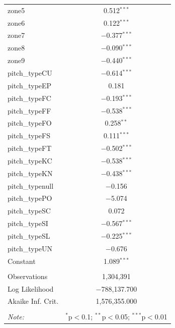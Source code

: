 \documentclass{article}
\begin{document}
\begin{table}[!htbp]
\begin{tabular}{@{\extracolsep{5pt}}lc}
 zone5 & 0.512$^{***}$ \\ 
  
 zone6 & 0.122$^{***}$ \\ 
 
 zone7 & $-$0.377$^{***}$ \\ 
  
 zone8 & $-$0.090$^{***}$ \\ 
 
 zone9 & $-$0.440$^{***}$ \\ 
 
 pitch\_typeCU & $-$0.614$^{***}$ \\ 
  
 pitch\_typeEP & 0.181 \\ 
 
 pitch\_typeFC & $-$0.193$^{***}$ \\ 
   
 pitch\_typeFF & $-$0.538$^{***}$ \\ 
  
 pitch\_typeFO & 0.258$^{**}$ \\ 
 
 pitch\_typeFS & 0.111$^{***}$ \\ 
  
 pitch\_typeFT & $-$0.502$^{***}$ \\ 
  
 pitch\_typeKC & $-$0.538$^{***}$ \\ 

 pitch\_typeKN & $-$0.438$^{***}$ \\ 
  
 pitch\_typenull & $-$0.156 \\ 
  
 pitch\_typePO & $-$5.074 \\ 
  
 pitch\_typeSC & 0.072 \\ 
 
 pitch\_typeSI & $-$0.567$^{***}$ \\ 
  
 pitch\_typeSL & $-$0.225$^{***}$ \\ 
  
 pitch\_typeUN & $-$0.676 \\ 
  
 Constant & 1.089$^{***}$ \\ 
 
\hline \\[-.8ex] 
Observations & 1,304,391 \\ 
Log Likelihood & $-$788,137.700 \\ 
Akaike Inf. Crit. & 1,576,355.000 \\ 
\hline 
\hline \\[-.8ex] 
\textit{Note:}  & \multicolumn{1}{r}{$^{*}$p$<$0.1; $^{**}$p$<$0.05; $^{***}$p$<$0.01} \\ 
\end{tabular} 
\end{table}
\end{document}
